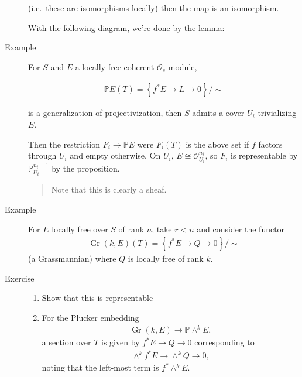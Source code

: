 \begin{description}
\begin{center}
\end{center}

(i.e.~these are isomorphisms locally) then the map is an isomorphism.

With the following diagram, we're done by the lemma:

\begin{center}
\end{center}
\item[Example]
For \(S\) and \(E\) a locally free coherent \({\mathcal{O}}_s\) module,

\begin{align*} {\mathbb{P}}E(T) = \left\{{f^* E \to L \to 0}\right\} / \sim \end{align*}

is a generalization of projectivization, then \(S\) admits a cover
\(U_i\) trivializing \(E\).

Then the restriction \(F_i \to {\mathbb{P}}E\) were \(F_i(T)\) is the
above set if \(f\) factors through \(U_i\) and empty otherwise. On
\(U_i\), \(E \cong {\mathcal{O}}_{U_i}^{n_i}\), so \(F_i\) is
representable by \({\mathbb{P}}_{U_i}^{n_i - 1}\) by the proposition.

\begin{quote}
Note that this is clearly a sheaf.
\end{quote}
\item[Example]
For \(E\) locally free over \(S\) of rank \(n\), take \(r<n\) and
consider the functor
\begin{align*}
{\operatorname{Gr}}(k, E)(T) = \left\{{f^*E \to Q \to 0}\right\} /\sim
\end{align*}
(a Grassmannian) where \(Q\) is locally free of rank \(k\).
\item[Exercise]
\hfill

\begin{enumerate}
\def\labelenumi{\alph{enumi}.}
\item
  Show that this is representable
\item
  For the Plucker embedding
  \begin{align*}
  {\operatorname{Gr}}(k, E) \to {\mathbb{P}}\wedge^k E
  ,\end{align*}
  a section over \(T\) is given by \(f^*E \to Q \to 0\) corresponding to
  \begin{align*}
  \wedge^k f^*E \to \wedge^k Q \to 0
  ,\end{align*}
  noting that the left-most term is \(f^* \wedge^k E\).
\end{enumerate}


\end{description}
